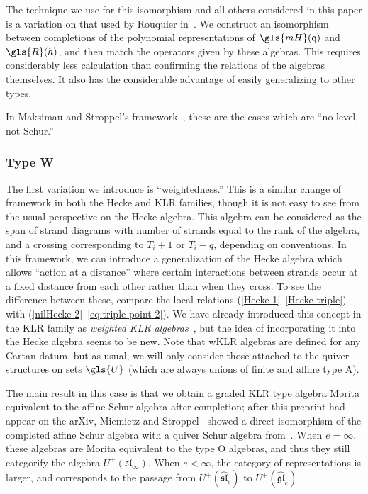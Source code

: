 \documentclass[10pt]{article}
\theoremstyle{definition}
\newcommand{\pq}{\mathsf{q}}
\begin{document}
The technique we use for this isomorphism and all others considered in
this paper is a variation on that
used by Rouquier in~\cite[\S~3.26]{Rou2KM}. We construct an isomorphism between
 completions of the polynomial representations of $\gls{mH}(\pq)$ and $\gls{R}(h)$,
 and then match the operators given by these algebras. This
 requires considerably less calculation than confirming the relations
 of the algebras themselves. It also has the considerable advantage of
 easily generalizing to other types.

 In Maksimau and Stroppel's framework~\cite{MS18}, these are the cases which are
 ``no level, not Schur.''

\subsubsection*{Type W} 
The first variation we introduce is ``weightedness.'' This is a
similar change of framework in both the Hecke and KLR families, though
it is not easy to see from the usual perspective on the Hecke algebra. This algebra
can be considered as the span of strand diagrams with number of strands equal to
the rank of the algebra, and a crossing corresponding to $T_i+1$ or
$T_i-q$, depending on conventions. In this framework, we can
introduce a generalization of the Hecke algebra which allows ``action
at a distance'' where certain interactions between strands occur at a
fixed distance from each other rather than when they cross. To see
the difference between these, compare the local relations
(\ref{Hecke-1}--\ref{Hecke-triple}) with
(\ref{nilHecke-2}--\ref{eq:triple-point-2}). We have already
introduced this concept in the KLR family as \emph{weighted KLR
 algebras}~\cite{WebwKLR}, but the idea of incorporating it into the
Hecke algebra seems to be new. Note that wKLR algebras are defined
for any Cartan datum, but as usual, we will only consider those
attached to the quiver structures on sets $\gls{U}$ (which are always unions
of finite and affine type A).

 The main result in this case is
that we obtain a graded KLR type algebra Morita equivalent to the
affine Schur algebra after completion; after this preprint had appear on the arXiv,
Miemietz and Stroppel~\cite{MiSt} showed a direct isomorphism of the \hbox{completed} affine Schur
algebra with a quiver Schur algebra from~\cite{SWschur}.
When $e=\infty$, these algebras are Morita equivalent to the type O
algebras, and thus they still categorify the algebra
$U^+(\mathfrak{sl}_\infty)$. When $e <\infty$, the category of
representations is larger, and corresponds to the passage from
$U^+(\mathfrak{\widehat{sl}}_e)$ to
$U^+(\mathfrak{\widehat{gl}}_e)$.
\end{document}
